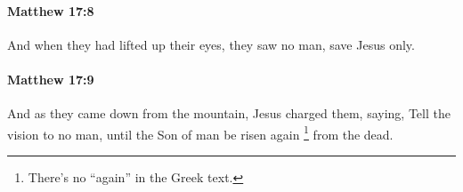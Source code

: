 		\paragraph{Matthew 17:8} %
			\label{MATTHEW-17-8}

			And when they had lifted up their eyes, they saw no man, save Jesus only.

			\begin{framed}
			\scriptsize
				\begin{compactdesc}
					\item[SBLG] 
				\end{compactdesc}
			\end{framed}

		\paragraph{Matthew 17:9} %
			\label{MATTHEW-17-9}

			And as they came down from the mountain, Jesus charged them, saying, Tell the vision to no man, until the Son of man be risen again%
				\footnote{%
					There's no ``again'' in the Greek text.
					}
			from the dead.

